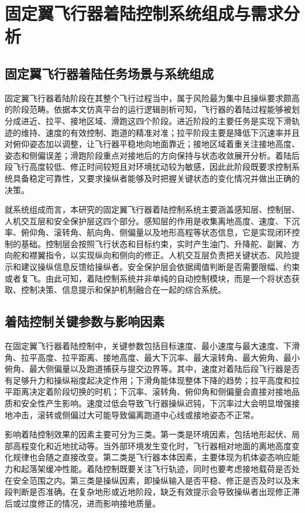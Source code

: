 \chapter{固定翼飞行器着陆控制系统组成与需求分析}

\section{固定翼飞行器着陆任务场景与系统组成}

固定翼飞行器着陆阶段在其整个飞行过程当中，属于风险最为集中且操纵要求颇高的阶段范畴。依据本文仿真平台的运行逻辑剖析可知，飞行器的着陆过程能够被划分成进近、拉平、接地区域、滑跑这四个阶段。进近阶段的主要任务是实现下滑轨迹的维持、速度的有效控制、跑道的精准对准；拉平阶段主要是降低下沉速率并且对俯仰姿态加以调整，让飞行器平稳地向地面靠近；接地区域着重关注接地高度、姿态和侧偏误差；滑跑阶段重点对接地后的方向保持与状态收敛展开分析。着陆后段飞行高度较低、修正时间较短且对环境扰动较为敏感，因此此阶段既要求控制系统具备稳定可靠性，又要求操纵者能够及时把握关键状态的变化情况并做出正确的决策。

就系统组成而言，本研究的固定翼飞行器着陆控制系统主要涵盖感知层、控制层、人机交互层和安全保护层这四个部分。感知层的作用是收集离地高度、速度、下沉率、俯仰角、滚转角、航向角、侧偏量以及地形高程等状态信息，它是实现闭环控制的基础。控制层会按照飞行状态和目标约束，实时产生油门、升降舵、副翼、方向舵和襟翼指令，以实现纵向和侧向的修正。人机交互层负责把关键状态、风险提示和建议操纵信息反馈给操纵者。安全保护层会依据阈值判断是否需要限幅、约束或者复飞。由此可知，着陆控制系统并非单纯的自动控制模块，而是一个将状态获取、控制决策、信息提示和保护机制融合在一起的综合系统。

\section{着陆控制关键参数与影响因素}

在固定翼飞行器着陆控制中，关键参数包括目标速度、最小速度与最大速度、下滑角、拉平高度、拉平距离、接地高度、最大下沉率、最大滚转角、最大俯角、最小俯角、最大侧偏量以及跑道捕获与提交边界等。其中，速度对着陆后段飞行器是否有足够升力和操纵裕度起决定作用；下滑角能体现整体下降的趋势；拉平高度和拉平距离决定着阶段切换的时机；下沉率、滚转角、俯仰角和侧偏量会直接对接地品质和安全性产生影响。速度过低会导致飞行器操纵迟钝，下沉率过大会明显增强接地冲击，滚转或侧偏过大可能导致偏离跑道中心线或接地姿态不正常。

影响着陆控制效果的因素主要可分为三类。第一类是环境因素，包括地形起伏、局部高程变化和近地扰动等。当外部环境发生变化时，飞行器相对地面的离地高度变化规律也会随之直接改变。第二类是飞行器本体因素，主要体现为机体姿态响应能力和起落架缓冲性能。着陆控制既要关注飞行轨迹，同时也要考虑接地载荷是否处在安全范围之内。第三类是操纵因素，即操纵输入是否平稳、修正是否及时以及末段判断是否准确。在复杂地形或近地阶段，缺乏有效提示会导致操纵者出现修正滞后或过度修正的情况，进而影响接地质量。

